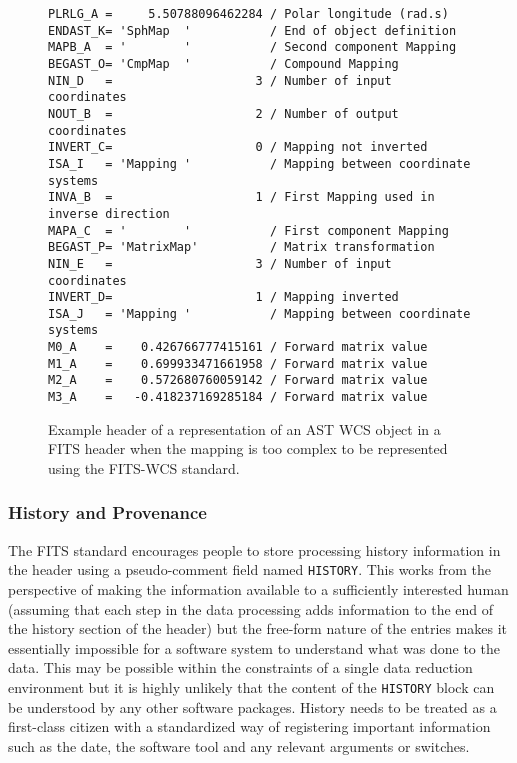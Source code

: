 \documentclass[final,authoryear,5p,times,twocolumn]{elsarticle}
\begin{document}
{{\begin{figure*}
\begin{minipage}{\textwidth}
\begin{verbatim}
PLRLG_A =     5.50788096462284 / Polar longitude (rad.s)
ENDAST_K= 'SphMap  '           / End of object definition
MAPB_A  = '        '           / Second component Mapping
BEGAST_O= 'CmpMap  '           / Compound Mapping
NIN_D   =                    3 / Number of input coordinates
NOUT_B  =                    2 / Number of output coordinates
INVERT_C=                    0 / Mapping not inverted
ISA_I   = 'Mapping '           / Mapping between coordinate systems
INVA_B  =                    1 / First Mapping used in inverse direction
MAPA_C  = '        '           / First component Mapping
BEGAST_P= 'MatrixMap'          / Matrix transformation
NIN_E   =                    3 / Number of input coordinates
INVERT_D=                    1 / Mapping inverted
ISA_J   = 'Mapping '           / Mapping between coordinate systems
M0_A    =    0.426766777415161 / Forward matrix value
M1_A    =    0.699933471661958 / Forward matrix value
M2_A    =    0.572680760059142 / Forward matrix value
M3_A    =   -0.418237169285184 / Forward matrix value
\end{verbatim}
\caption{Example header of a representation of an AST WCS object in a
  FITS header  when the mapping is too complex to be represented using the
  FITS-WCS standard.}
\label{fig:asthead}
\end{minipage}
\end{figure*}


\subsubsection{History and Provenance}


The FITS standard encourages people to store processing history
information in the header using a pseudo-comment field named
\texttt{HISTORY}. This works from the perspective of making the information
available to a sufficiently interested human (assuming that each step in the
data processing adds information to the end of the history section of the
header) but the free-form nature of the entries makes it essentially
impossible for a software system to understand what was done to the data.
This may be possible within the constraints of a single data reduction
environment but it is highly unlikely that the content of the
\texttt{HISTORY} block can be understood by any other software packages. History
needs to be treated as a first-class citizen with a standardized way of
registering important information such as the date, the software tool and
any relevant arguments or switches. 


}}
\end{document}
